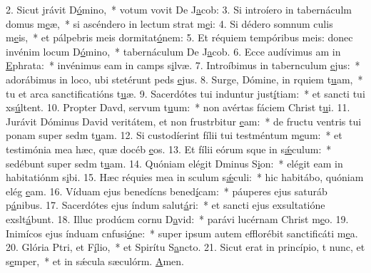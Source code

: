 2. Sicut jrávit D\uline{ó}mino,~* votum vovit De J\uline{a}cob:
3. Si introíero in tabernáculm domus m\uline{e}æ,~* si ascéndero in lectum strat m\uline{e}i:
4. Si dédero somnum culis m\uline{e}is,~* et pálpebris meis dormitat\uline{ó}nem:
5. Et réquiem tempóribus meis: donec invénim locum D\uline{ó}mino,~* tabernáculum De J\uline{a}cob.
6. Ecce audívimus am in \uline{E}phrata:~* invénimus eam in camps s\uline{i}lvæ.
7. Introíbimus in tabernculum \uline{e}jus:~* adorábimus in loco, ubi stetérunt peds \uline{e}jus.
8. Surge, Dómine, in rquiem t\uline{u}am,~* tu et arca sanctificatións t\uline{u}æ.
9. Sacerdótes tui induntur just\uline{í}tiam:~* et sancti tui xs\uline{ú}ltent.
10. Propter Davd, servum t\uline{u}um:~* non avértas fáciem Christ t\uline{u}i.
11. Jurávit Dóminus David veritátem, et non frustrbitur \uline{e}am:~* de fructu ventris tui ponam super sedm t\uline{u}am.
12. Si custodíerint fílii tui testméntum m\uline{e}um:~* et testimónia mea hæc, quæ docéb \uline{e}os.
13. Et fílii eórum sque in s\uline{ǽ}culum:~* sedébunt super sedm t\uline{u}am.
14. Quóniam elégit Dminus S\uline{i}on:~* elégit eam in habitatiónm s\uline{i}bi.
15. Hæc réquies mea in sculum s\uline{ǽ}culi:~* hic habitábo, quóniam elég \uline{e}am.
16. Víduam ejus benedícns bened\uline{í}cam:~* páuperes ejus saturáb p\uline{á}nibus.
17. Sacerdótes ejus índum salut\uline{á}ri:~* et sancti ejus exsultatióne exslt\uline{á}bunt.
18. Illuc prodúcm cornu D\uline{a}vid:~* parávi lucérnam Christ m\uline{e}o.
19. Inimícos ejus índuam cnfusi\uline{ó}ne:~* super ipsum autem efflorébit sanctificáti m\uline{e}a.
20. Glória Ptri, et F\uline{í}lio,~* et Spirítu S\uline{a}ncto.
21. Sicut erat in princípio, t nunc, et s\uline{e}mper,~* et in sǽcula sæculórm. \uline{A}men.
